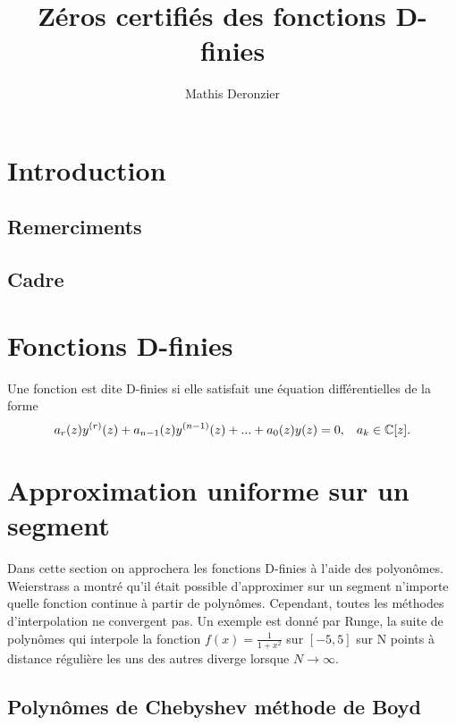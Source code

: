 \documentclass[a4paper,10.5pt]{article}
\title{Zéros certifiés des fonctions D-finies}
\author{Mathis Deronzier}
\date{}
\begin{document}
	
	\maketitle
	\renewcommand{\contentsname}{Sommaire}
	\newpage
	\tableofcontents
	\newpage
	
	\section{Introduction}
	\newtheorem{theorem}{Théorème}[section] 
	\newtheorem{proposition}{Proposition}
	\newtheorem{corollaire}{Corollaire}
	\newtheorem{definition}{Définition}
	\subsection{Remerciments}
	\subsection{Cadre}
	\section{Fonctions D-finies}
	
	Une fonction est dite  D-finies si elle satisfait une équation différentielles de la forme
	\begin{equation}
		a_{r}(z)y^{(r)}(z)+a_{n-1}(z)y^{(n-1)}(z)+...+a_{0}(z)y(z)=0, \hspace{3mm} a_{k}\in \mathbb{C}[z].
	\end{equation}
 
	
	
	
	
	
	\section{Approximation uniforme sur un segment}
	
	Dans cette section on approchera les fonctions D-finies à l'aide des polyonômes.
	Weierstrass a montré qu'il était possible d'approximer sur un segment n'importe quelle fonction continue à partir de polynômes. Cependant, toutes les méthodes d'interpolation ne convergent pas. Un exemple est donné par Runge, la suite de polynômes qui interpole la fonction $f(x)=\frac{1}{1+x^{2}}$ sur $[-5,5]$ sur N points à distance régulière les uns des autres diverge lorsque $N \rightarrow \infty$.
	
	\subsection{Polynômes de Chebyshev méthode de Boyd}
	
\end{document}
